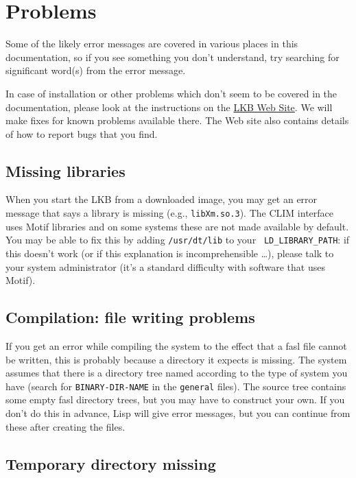 \documentclass[12pt]{report}
\newcommand{\filename}[1]{{\tt #1}}
\begin{document}
\section{Problems}
\label{problems}

Some of the likely error messages are covered in various places in this
documentation, so if you see something you don't understand, try searching for
significant word(s) from the error message.

In case of installation or other problems which don't seem to be covered in the
documentation, please look at the instructions on the
\href{http://www-csli.stanford.edu/~aac/lkb.html}{LKB Web Site}.  We will make
fixes for known problems available there.  The Web site also contains details
of how to report bugs that you find.

\subsection{Missing libraries}

When you start the LKB from a downloaded image, you may get an error message that
says a library is missing (e.g., \filename{libXm.so.3}).  The CLIM interface uses
Motif libraries and on some systems these are not made available by default.
You may be able to fix this by adding \filename{/usr/dt/lib} to your {\tt
LD\_LIBRARY\_PATH}: if this doesn't work (or if this explanation is
incomprehensible \ldots), please talk to your system administrator (it's a
standard difficulty with software that uses Motif).

\subsection{Compilation: file writing problems}

If you get an error while compiling the system to the effect that
a fasl file cannot be written, this is probably because a directory it
expects is missing.
The system assumes that there
is a directory tree named according to the type of system you have
(search for {\tt BINARY-DIR-NAME} in the \filename{general} files).
The source tree contains some empty fasl directory trees, but you
may have to construct your own.
If you don't do this in advance, Lisp will give error messages, but
you can continue from these after creating the files.


\subsection{Temporary directory missing}
\end{document}
